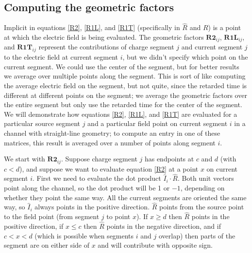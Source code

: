 \documentclass{article}
\newcommand{\mat}{\mathbf}
\begin{document}
\subsection{Computing the geometric factors}
Implicit in equations \ref{R2}, \ref{R1L}, and \ref{R1T} (specifically in $\hat{R}$ and $R$) is a point at which the electric field is being evaluated. The geometric factors $\mat{R2}_{ij}$, $\mat{R1L}_{ij}$, and $\mat{R1T}_{ij}$ represent the contributions of charge segment $j$ and current segment $j$ to the electric field at current segment $i$, but we didn't specify which point on the current segment. We could use the center of the segment, but for better results we average over multiple points along the segment. This is sort of like computing the average electric field on the segment, but not quite, since the retarded time is different at different points on the segment; we average the geometric factors over the entire segment but only use the retarded time for the center of the segment. We will demonstrate how equations \ref{R2}, \ref{R1L}, and \ref{R1T} are evaluated for a particular source segment $j$ and a particular field point on current segment $i$ in a channel with straight-line geometry; to compute an entry in one of these matrices, this result is averaged over a number of points along segment $i$.

We start with $\mat{R2}_{ij}$. Suppose charge segment $j$ has endpoints at $c$ and $d$ (with $c<d$), and suppose we want to evaluate equation \ref{R2} at a point $x$ on current segment $i$. First we need to evaluate the dot product $\hat{I}_i\cdot\hat{R}$. Both unit vectors point along the channel, so the dot product will be 1 or $-1$, depending on whether they point the same way. All the current segments are oriented the same way, so $\hat{I}_i$ always points in the positive direction. $\hat{R}$ points from the source point to the field point (from segment $j$ to point $x$). If $x \geq d$ then $\hat{R}$ points in the positive direction, if $x \leq c$ then $\hat{R}$ points in the negative direction, and if $c<x<d$ (which is possible when segments $i$ and $j$ overlap) then parts of the segment are on either side of $x$ and will contribute with opposite sign.
\end{document}
